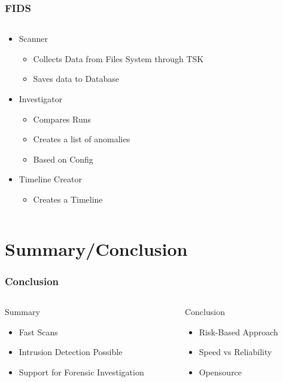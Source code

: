 \documentclass{beamer}
\begin{document}
\begin{frame}[fragile]
  \frametitle{FIDS}
  \begin{columns}
    \begin{column}{1\textwidth}
      \begin{itemize}
        \item Scanner
        \begin{itemize}
          \item Collects Data from Files System through TSK
          \item Saves data to Database
        \end{itemize}
        \pause
        \item Investigator
        \begin{itemize}
          \item Compares Runs
          \item Creates a list of anomalies
          \item Based on Config
        \end{itemize}
        \pause
        \item Timeline Creator
        \begin{itemize}
          \item Creates a Timeline
        \end{itemize}
      \end{itemize}
    \end{column}
  \end{columns}
\end{frame}

\section{Summary/Conclusion}

\begin{frame}[fragile]
  \frametitle{Conclusion}
  \begin{columns}
    \begin{column}{0.5\textwidth}
      Summary
      \begin{itemize}
          \item Fast Scans
          \item Intrusion Detection Possible
          \item Support for Forensic Investigation
      \end{itemize}
    \end{column}
    \pause
    \begin{column}{0.5\textwidth}
      Conclusion
      \begin{itemize}
        \item Risk-Based Approach
        \item Speed vs Reliability
        \item Opensource
      \end{itemize}
    \end{column}
  \end{columns}
\end{frame}
\end{document}
